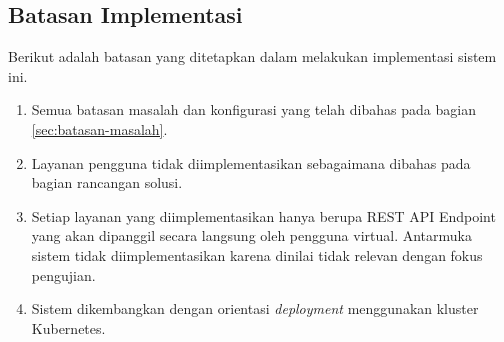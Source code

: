 \subsection{Batasan Implementasi}

Berikut adalah batasan yang ditetapkan dalam melakukan implementasi sistem ini.

\begin{enumerate}
  \item Semua batasan masalah dan konfigurasi yang telah dibahas pada bagian \ref{sec:batasan-masalah}.
  \item Layanan pengguna tidak diimplementasikan sebagaimana dibahas pada bagian rancangan solusi.
  \item Setiap layanan yang diimplementasikan hanya berupa REST API Endpoint yang akan dipanggil secara langsung oleh pengguna virtual. Antarmuka sistem tidak diimplementasikan karena dinilai tidak relevan dengan fokus pengujian.
  \item Sistem dikembangkan dengan orientasi \textit{deployment} menggunakan kluster Kubernetes.
\end{enumerate}
